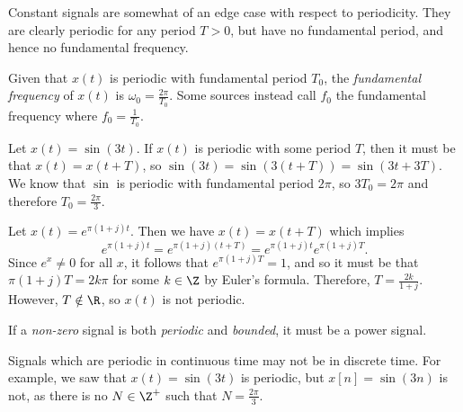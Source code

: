 \documentclass[12pt]{article}
\begin{document}
\begin{rmk}
    Constant signals are somewhat of an edge case with respect to periodicity. They are clearly periodic for any period $T > 0$, but have no fundamental period, and hence no fundamental frequency.
\end{rmk}

\begin{defn}
    Given that $x(t)$ is periodic with fundamental period $T_0$, the \emph{fundamental frequency} of $x(t)$ is $\omega_0 = \frac{2\pi}{T_0}$. Some sources instead call $f_0$ the fundamental frequency where $f_0 = \frac{1}{T_0}$.
\end{defn}

\begin{exmp}
    Let $x(t) = \sin(3t)$. If $x(t)$ is periodic with some period $T$, then it must be that $x(t) = x(t + T)$, so $\sin(3t) = \sin(3(t + T)) = \sin(3t + 3T)$. We know that $\sin$ is periodic with fundamental period $2\pi$, so $3T_0 = 2\pi$ and therefore $T_0 = \frac{2\pi}{3}$.
\end{exmp}

\begin{exmp}
    Let $x(t) = e^{\pi(1 + j)t}$. Then we have $x(t) = x(t + T)$ which implies \[e^{\pi(1 + j)t} = e^{\pi(1 + j)(t + T)} = e^{\pi(1 + j)t}e^{\pi(1 + j)T}.\] Since $e^x \neq 0$ for all $x$, it follows that $e^{\pi(1 + j)T} = 1$, and so it must be that $\pi(1 + j)T = 2k{\pi}$ for some $k \in \Z$ by Euler's formula. Therefore, $T = \frac{2k}{1 + j}$. However, $T \notin \R$, so $x(t)$ is not periodic.
\end{exmp}

\begin{rmk}
    If a \emph{non-zero} signal is both \emph{periodic} and \emph{bounded}, it must be a power signal.
\end{rmk}

\begin{rmk}
    Signals which are periodic in continuous time may not be in discrete time. For example, we saw that $x(t) = \sin(3t)$ is periodic, but $x[n] = \sin(3n)$ is not, as there is no $N \in \Z^+$ such that $N = \frac{2\pi}{3}$.
\end{rmk}
\end{document}
